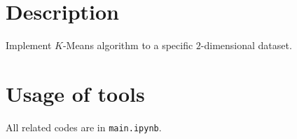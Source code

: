 \documentclass[english, nochinese]{../../TeXTemplate/pkupaper}
\title{\titlemark}
\author{pppppass}
\date{January 30, 2018}
\begin{document}
\maketitle

\section{Description}

Implement $K$-Means algorithm to a specific $2$-dimensional dataset.

\section{Usage of tools}

All related codes are in \verb"main.ipynb".
\end{document}
